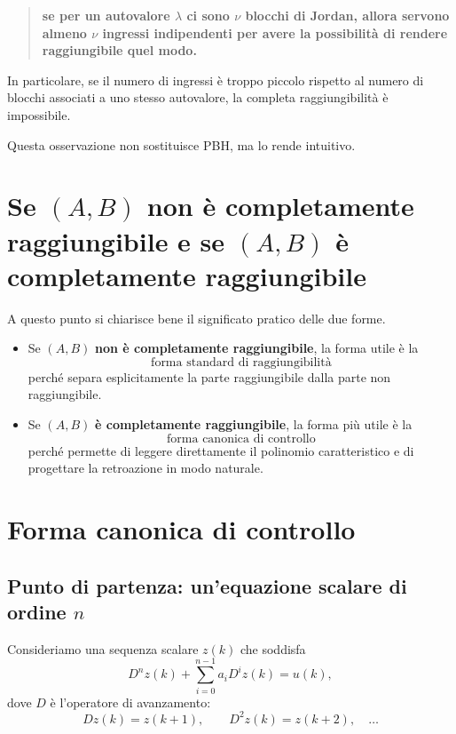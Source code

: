 \begin{quote}
\textbf{se per un autovalore \(\lambda\) ci sono \(\nu\) blocchi di Jordan, allora servono almeno \(\nu\) ingressi indipendenti per avere la possibilità di rendere raggiungibile quel modo.}
\end{quote}

In particolare, se il numero di ingressi è troppo piccolo rispetto al numero di blocchi associati a uno stesso autovalore, la completa raggiungibilità è impossibile.

Questa osservazione non sostituisce PBH, ma lo rende intuitivo.

\section{Se \((A,B)\) non è completamente raggiungibile e se \((A,B)\) è completamente raggiungibile}

A questo punto si chiarisce bene il significato pratico delle due forme.

\begin{itemize}
    \item Se \((A,B)\) \textbf{non è completamente raggiungibile}, la forma utile è la
    \[
    \boxed{\text{forma standard di raggiungibilità}}
    \]
    perché separa esplicitamente la parte raggiungibile dalla parte non raggiungibile.

    \item Se \((A,B)\) \textbf{è completamente raggiungibile}, la forma più utile è la
    \[
    \boxed{\text{forma canonica di controllo}}
    \]
    perché permette di leggere direttamente il polinomio caratteristico e di progettare la retroazione in modo naturale.
\end{itemize}

\section{Forma canonica di controllo}

\subsection{Punto di partenza: un’equazione scalare di ordine \(n\)}

Consideriamo una sequenza scalare \(z(k)\) che soddisfa
\begin{equation}
D^n z(k)+\sum_{i=0}^{n-1} a_i D^i z(k)=u(k),
\label{eq:L14_eq_scalare}
\end{equation}
dove \(D\) è l’operatore di avanzamento:
\[
Dz(k)=z(k+1),\qquad D^2z(k)=z(k+2),\quad \dots
\]


